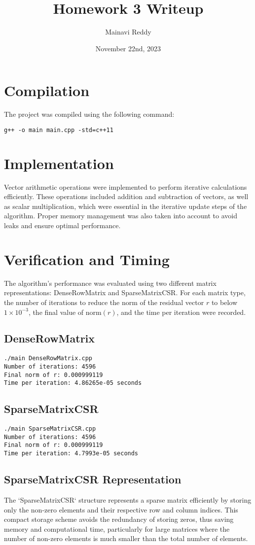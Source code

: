 \documentclass{article}
\title{Homework 3 Writeup}
\author{Mainavi Reddy}
\date{November 22nd, 2023}
\begin{document}
\maketitle

\section{Compilation}
The project was compiled using the following command:
\begin{verbatim}
g++ -o main main.cpp -std=c++11
\end{verbatim}

\section{Implementation}
Vector arithmetic operations were implemented to perform iterative calculations efficiently. These operations included addition and subtraction of vectors, as well as scalar multiplication, which were essential in the iterative update steps of the algorithm. Proper memory management was also taken into account to avoid leaks and ensure optimal performance.

\section{Verification and Timing}
The algorithm's performance was evaluated using two different matrix representations: DenseRowMatrix and SparseMatrixCSR. For each matrix type, the number of iterations to reduce the norm of the residual vector \( r \) to below \( 1 \times 10^{-3} \), the final value of \( \text{norm}(r) \), and the time per iteration were recorded.

\subsection{DenseRowMatrix}
\begin{verbatim}
./main DenseRowMatrix.cpp
Number of iterations: 4596
Final norm of r: 0.000999119
Time per iteration: 4.86265e-05 seconds
\end{verbatim}

\subsection{SparseMatrixCSR}
\begin{verbatim}
./main SparseMatrixCSR.cpp
Number of iterations: 4596
Final norm of r: 0.000999119
Time per iteration: 4.7993e-05 seconds
\end{verbatim}

\subsection{SparseMatrixCSR Representation}
The `SparseMatrixCSR` structure represents a sparse matrix efficiently by storing only the non-zero elements and their respective row and column indices. This compact storage scheme avoids the redundancy of storing zeros, thus saving memory and computational time, particularly for large matrices where the number of non-zero elements is much smaller than the total number of elements.
\end{document}

